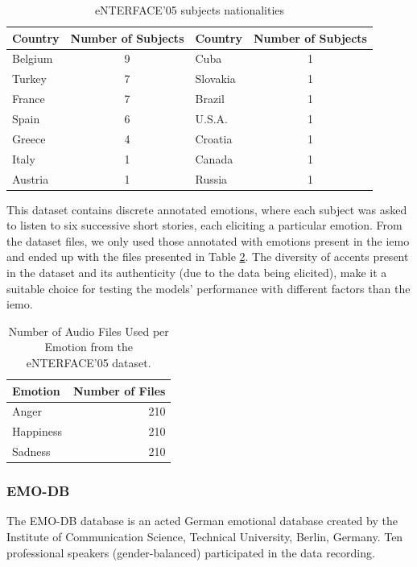 \begin{table}[H]
	\centering
	\caption{eNTERFACE'05 subjects nationalities}
	\label{tab:enterfaceDiversity}
	\begin{tabular}{lc|lc}
		\toprule
		Country &Number of Subjects &Country &Number of Subjects\\
		\midrule
		Belgium & 9 & Cuba     & 1\\
		Turkey  & 7 & Slovakia & 1\\
		France  & 7 & Brazil   & 1\\
		Spain   & 6 & U.S.A.   & 1\\
		Greece  & 4 & Croatia  & 1\\
		Italy   & 1 & Canada   & 1\\
		Austria & 1 & Russia   & 1\\
		\bottomrule
	\end{tabular}
\end{table}

This dataset contains discrete annotated emotions, where each subject was asked to listen to six successive short stories, each eliciting a particular emotion. From the dataset files, we only used those annotated with emotions present in the \ac{iemo} and ended up with the files presented in Table \ref{tab:ent_files}. The diversity of accents present in the dataset and its authenticity (due to the data being elicited), make it a suitable choice for testing the models' performance with different factors than the \ac{iemo}.

\begin{table}[H]
	\centering
	\label{tab:ent_files}
	\caption{Number of Audio Files Used per Emotion from the eNTERFACE'05 dataset.}
	\begin{tabular}{lr}
		\toprule
		Emotion     &   Number of Files \\
		\midrule
		Anger      	&               210 \\
		Happiness 	&               210 \\
		Sadness    	&               210 \\
		\bottomrule
	\end{tabular}
\end{table}


\subsubsection{EMO-DB}

The EMO-DB database is an acted German emotional database created by the Institute of Communication Science, Technical University, Berlin, Germany. Ten professional speakers (gender-balanced) participated in the data recording.

